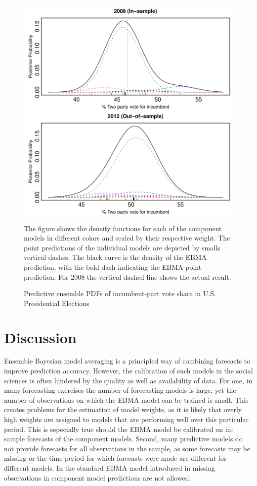 \documentclass[12pt,fullpage,endnotes]{article}
\begin{document}
\begin{figure}[h]
\caption{Predictive ensemble PDFs of incumbent-part vote share in U.S. Presidential Elections}
\label{pres}
\begin{center}
\includegraphics[scale=.8]{presForecast}
\end{center}
The figure shows the density functions for each of the component
models in different colors and scaled by their respective weight. The
point predictions of the individual models are depicted by smalls
vertical dashes. The black curve is the density of the EBMA
prediction, with the bold dash indicating the EBMA point
prediction. For 2008 the vertical dashed line shows the actual result.
\end{figure}


\section{Discussion} 

Ensemble Bayesian model averaging is a principled way of combining
forecasts to improve prediction accuracy. However, the calibration of
such models in the social sciences is often hindered by the quality as
well as availability of data. For one, in many forecasting exercises
the number of forecasting models is large, yet the number of
observations on which the EBMA model can be trained is small. This
creates problems for the estimation of model weights, as it is likely
that overly high weights are assigned to models that are performing
well over this particular period. This is especially true should the
EBMA model be calibrated on in-sample forecasts of the component
models. Second, many predictive models do not provide forecasts for
all observations in the sample, as some forecasts may be missing or
the time-period for which forecasts were made are different for
different models. In the standard EBMA model introduced in
\citet{mhw:2012} missing observations in component model predictions
are not allowed.
\end{document}
